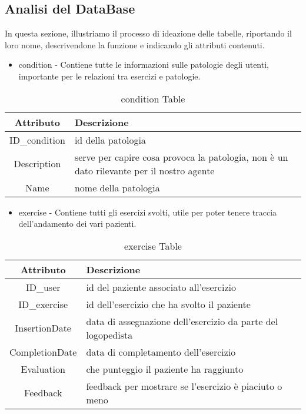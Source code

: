 \documentclass{article}
\begin{document}
    \pagebreak

    \subsection{Analisi del DataBase}
    In questa sezione, illustriamo il processo di ideazione delle tabelle, riportando il loro nome, descrivendone la funzione e indicando gli attributi contenuti.

\begin{itemize}
\item     condition - Contiene tutte le informazioni sulle patologie degli utenti, importante per le relazioni tra esercizi e patologie.
\end{itemize}

    \begin{table}[h]
        \centering
        \caption{condition Table}
        \begin{tabular}{|c|p{8cm}|}
            \hline
                \textbf{Attributo} & \textbf{Descrizione} \\
            \hline
                ID\_condition & id della patologia\\
            \hline
                Description & serve per capire cosa provoca la patologia, non è un dato rilevante per il nostro agente\\
            \hline
                Name & nome della patologia\\
            \hline
        \end{tabular}
    \end{table}

\begin{itemize}
\item    exercise - Contiene tutti gli esercizi svolti, utile per poter tenere traccia dell'andamento dei vari pazienti.
\end{itemize}

    \begin{table}[h]
        \centering
        \caption{exercise Table}
        \begin{tabular}{|c|p{8cm}|}
            \hline
                \textbf{Attributo} & \textbf{Descrizione} \\
            \hline
                ID\_user & id del paziente associato all'esercizio\\
            \hline
                ID\_exercise & id dell'esercizio che ha svolto il paziente\\
            \hline
                InsertionDate & data di assegnazione dell'esercizio da parte del logopedista\\
            \hline
                CompletionDate & data di completamento dell'esercizio\\
            \hline
                Evaluation & che punteggio il paziente ha raggiunto\\
            \hline
                Feedback & feedback per mostrare se l'esercizio è piaciuto o meno\\
            \hline
        \end{tabular}
    \end{table}
\end{document}
